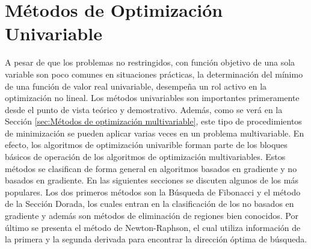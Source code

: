 \section{Métodos de Optimización Univariable}
A pesar de que los problemas no restringidos, con función objetivo de una sola variable son poco comunes en situaciones prácticas, la determinación del mínimo de una función de valor real univariable, desempeña un rol activo en la optimización no lineal. Los métodos univariables son importantes primeramente desde el punto de vista teórico y demostrativo. Además, como se verá en la Sección \ref{sec:Métodos de optimización multivariable}, este tipo de procedimientos de minimización se pueden aplicar varias veces en un problema multivariable. En efecto, los algoritmos de optimización univarible forman parte de los bloques básicos de operación de los algoritmos de optimización multivariables.  Estos métodos se clasifican de forma general en algoritmos basados en gradiente y no basados en gradiente. En las siguientes secciones se discuten algunos de los más populares. Los dos primeros métodos son la Búsqueda de Fibonacci y el método de la Sección Dorada, los cuales entran en la clasificación de los no basados en gradiente y además son métodos de eliminación de regiones bien conocidos. Por último se presenta el método de Newton-Raphson, el cual utiliza información de la primera y la segunda derivada para encontrar la dirección óptima de búsqueda. 


